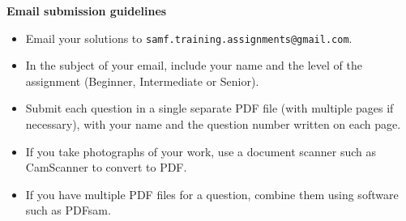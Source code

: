 \documentclass{article}
\begin{document}
\vfill
\textbf{\Large Email submission guidelines}
\begin{itemize}
	\item Email your solutions to \verb!samf.training.assignments@gmail.com!.
	\item In the subject of your email, include your name and the level of the assignment (Beginner, Intermediate or Senior).
	\item Submit each question in a single separate PDF file (with multiple pages if necessary), with your name and the question number written on each page.
	\item If you take photographs of your work, use a document scanner such as CamScanner to convert to PDF.
	\item If you have multiple PDF files for a question, combine them using software such as PDFsam.
\end{itemize}
\end{document}
